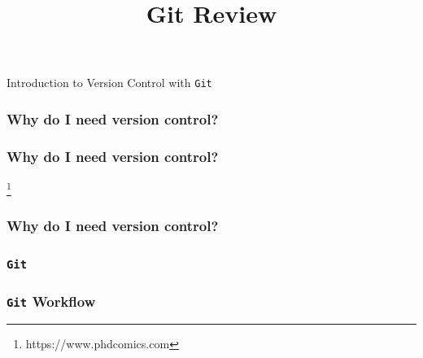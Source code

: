 \documentclass{beamer}
\title{Git Review}
\begin{document}
\begin{frame}
\begin{center}
Introduction to Version Control with \texttt{Git}
\end{center}
\end{frame}

\begin{frame}
\frametitle{Why do I need version control?}
\end{frame}


\begin{frame}
\frametitle{Why do I need version control?}
\begin{center}
\end{center}
\footnote{\footnotesize{https://www.phdcomics.com}}
\end{frame}

\begin{frame}
\frametitle{Why do I need version control?}

\end{frame}

\begin{frame}
\frametitle{\texttt{Git}}

\end{frame}

\begin{frame}
\frametitle{\texttt{Git} Workflow}

\end{frame}
\end{document}
